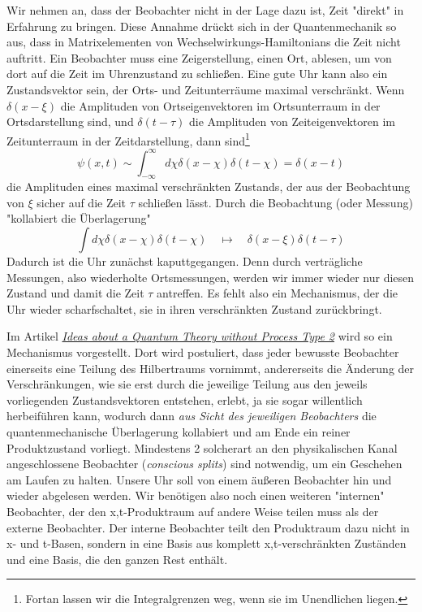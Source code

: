 \documentclass[12pt]{article}
\begin{document}
Wir nehmen an, dass der Beobachter nicht in der Lage dazu ist, Zeit "direkt" in Erfahrung zu bringen. Diese Annahme drückt sich in der Quantenmechanik so aus, dass in Matrixelementen von Wechselwirkungs-Hamiltonians die Zeit nicht auftritt. Ein Beobachter muss eine Zeigerstellung, einen Ort, ablesen, um von dort auf die Zeit im Uhrenzustand zu schließen. Eine gute Uhr kann also ein Zustandsvektor sein, der Orts- und Zeitunterräume maximal verschränkt. Wenn $\delta(x-\xi)$ die Amplituden von Ortseigenvektoren im Ortsunterraum in der Ortsdarstellung sind, und $\delta(t-\tau)$ die Amplituden von Zeiteigenvektoren im Zeitunterraum in der Zeitdarstellung, dann sind\footnote{Fortan lassen wir die Integralgrenzen weg, wenn sie im Unendlichen liegen.}
\begin{equation} 
\label{eq:psi_clock}
\psi(x,t) \sim \int_{-\infty}^{\infty} d\chi \delta(x-\chi) \delta(t-\chi) = \delta(x-t)
\end{equation}
die Amplituden eines maximal verschränkten Zustands, der aus der Beobachtung von $\xi$ sicher auf die Zeit $\tau$ schließen lässt. Durch die Beobachtung (oder Messung) "kollabiert die Überlagerung"
\begin{equation} 
\label{eq:collapse}
\int d\chi \delta(x-\chi) \delta(t-\chi) \quad \longmapsto \quad \delta(x-\xi)\delta(t-\tau)
\end{equation}
Dadurch ist die Uhr zunächst kaputtgegangen. Denn durch verträgliche Messungen, also wiederholte Ortsmessungen, werden wir immer wieder nur diesen Zustand und damit die Zeit $\tau$ antreffen. Es fehlt also ein Mechanismus, der die Uhr wieder scharfschaltet, sie in ihren verschränkten Zustand zurückbringt.

Im Artikel \emph{\href{https://docs.google.com/document/d/1OrmVETmnBSe5c0CpTbKH8Vq5pWFuB8QUez-KqHTaarQ/edit?usp=sharing}{Ideas about a Quantum Theory without Process Type 2}} wird so ein Mechanismus vorgestellt. Dort wird postuliert, dass jeder bewusste Beobachter einerseits eine Teilung des Hilbertraums vornimmt, andererseits die Änderung der Verschränkungen, wie sie erst durch die jeweilige Teilung aus den jeweils vorliegenden Zustandsvektoren entstehen, erlebt, ja sie sogar willentlich herbeiführen kann, wodurch dann \emph{aus Sicht des jeweiligen Beobachters} die quantenmechanische Überlagerung kollabiert und am Ende ein reiner Produktzustand vorliegt. Mindestens 2 solcherart an den physikalischen Kanal angeschlossene Beobachter (\emph{conscious splits}) sind notwendig, um ein Geschehen am Laufen zu halten. Unsere Uhr soll von einem äußeren Beobachter hin und wieder abgelesen werden. Wir benötigen also noch einen weiteren "internen" Beobachter, der den x,t-Produktraum auf andere Weise teilen muss als der externe Beobachter. Der interne Beobachter teilt den Produktraum dazu nicht in x- und t-Basen, sondern in eine Basis aus komplett x,t-verschränkten Zuständen und eine Basis, die den ganzen Rest enthält.
\end{document}
